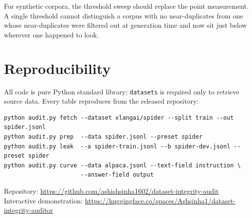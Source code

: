 \documentclass[11pt]{article}
\begin{document}
For synthetic corpora, the threshold sweep should replace the point
measurement. A single threshold cannot distinguish a corpus with no
near-duplicates from one whose near-duplicates were filtered out at generation
time and now sit just below wherever one happened to look.

\section*{Reproducibility}

All code is pure Python standard library; \texttt{datasets} is required only to
retrieve source data. Every table reproduces from the released repository:

\begin{verbatim}
python audit.py fetch --dataset xlangai/spider --split train --out spider.jsonl
python audit.py prep  --data spider.jsonl --preset spider
python audit.py leak  --a spider-train.jsonl --b spider-dev.jsonl --preset spider
python audit.py curve --data alpaca.jsonl --text-field instruction \
                      --answer-field output
\end{verbatim}

Repository: \url{https://github.com/ashishsinha1602/dataset-integrity-audit}\\
Interactive demonstration:
\url{https://huggingface.co/spaces/Ashsinha1/dataset-integrity-auditor}
\end{document}
